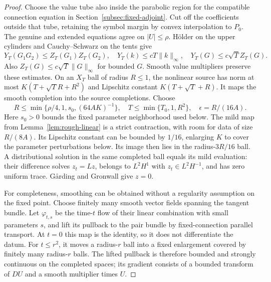 \documentclass[11pt]{article}
\numberwithin{equation}{section}
\theoremstyle{definition}
\theoremstyle{remark}
\begin{document}
\begin{proof}
Choose the value tube also inside the parabolic region for
the compatible connection equation in
Section~\ref{subsec:fixed-adjoint}.
Cut off the coefficients outside that tube, retaining
the symbol margin by convex interpolation to $P_0$.
The genuine and extended equations agree on $|U|\le\rho$.
Hölder on the upper cylinders and Cauchy--Schwarz on the tents
give
\[
 Y_T(G_1G_2)\le Z_T(G_1)Z_T(G_2),\quad
 Y_T(k)\le cT\|k\|_\infty,\quad
 Y_T(G)\le c\sqrt T Z_T(G).
\]
Also $Z_T(G)\le c\sqrt T\|G\|_\infty$ for bounded $G$.
Smooth value multipliers preserve these estimates.
On an $X_T$ ball of radius $R\le1$, the nonlinear source has
norm at most $K(T+\sqrt T R+R^2)$ and Lipschitz constant
$K(T+\sqrt T+R)$. It maps the smooth completion into the
source completions. Choose
\[
 R\le\min\{\rho/4,1,s_0,(64AK)^{-1}\},\quad
 T\le\min\{T_0,1,R^2\},\quad \epsilon=R/(16A).
\]
Here $s_0>0$ bounds the fixed parameter neighborhood used below.
The mild map from Lemma~\ref{lem:rough-linear} is a strict
contraction, with room for data of size $R/(8A)$.
Its Lipschitz constant can be bounded by $1/16$, enlarging
$K$ to cover the parameter perturbations below. Its image
then lies in the radius-$3R/16$ ball.
A distributional solution in the same completed ball equals
its mild evaluation: their difference solves $z_t=Lz$,
belongs to $L^2H^1$ with $z_t\in L^2H^{-1}$, and has zero
uniform trace. Gårding and Gronwall give $z=0$.

For completeness, smoothing can be obtained without a
regularity assumption on the fixed point. Choose finitely many
smooth vector fields spanning the tangent bundle. Let
$\varphi_{t,s}$ be the time-$t$ flow of their linear combination
with small parameters $s$, and lift its pullback to the pair
bundle by fixed-connection parallel transport. At $t=0$ this
map is the identity, so it does not differentiate the datum.
For $t\le r^2$, it moves a radius-$r$ ball into a fixed
enlargement covered by finitely many radius-$r$ balls.
The lifted pullback is therefore bounded and strongly continuous
on the completed spaces; its gradient consists of a bounded
transform of $DU$ and a smooth multiplier times $U$.


\end{proof}
\end{document}
